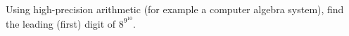 Using high-precision arithmetic (for example a computer algebra system), find the leading (first) digit of $8^{9^{10}}$.
